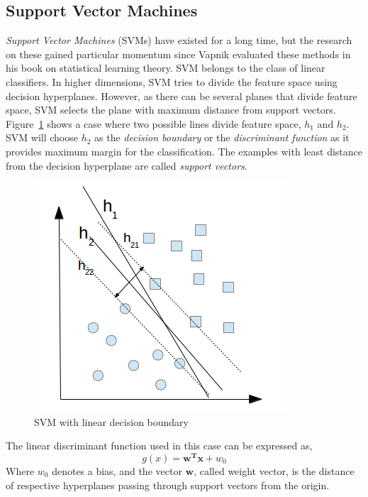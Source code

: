 \subsection{Support Vector Machines}
\label{mltypes:svm}
\emph{Support Vector Machines} (SVMs) have existed for a long time, but the research on these gained particular momentum since Vapnik \cite{Vapnik1995} evaluated these methods in his book on statistical learning theory. SVM belongs to the class of linear classifiers. In higher dimensions, SVM tries to divide the feature space using decision hyperplanes. However, as there can be several planes that divide feature space, SVM selects the plane with maximum distance from support vectors. Figure~\ref{fig:svm1} shows a case where two possible lines divide feature space, $h_1$ and $h_2$. SVM will choose $h_2$ as the \emph{decision boundary} or the \emph{discriminant function} as it provides maximum margin for the classification. The examples with least distance from the decision hyperplane are called \emph{support vectors}.

\begin{figure}[h]
  \begin{center}
    \captionsetup{justification=centering}
    \includegraphics[scale=0.45]{figures/svm1.png}
    \caption{SVM with linear decision boundary}
    \label{fig:svm1}
  \end{center}
\end{figure}
The linear discriminant function used in this case can be expressed as,
\[g(x) = \boldsymbol{w^T}\boldsymbol{x} + w_0 \]
Where $w_0$ denotes a bias, and the vector $\boldsymbol{w}$, called weight vector, is the distance of respective hyperplanes passing through support vectors from the origin.


